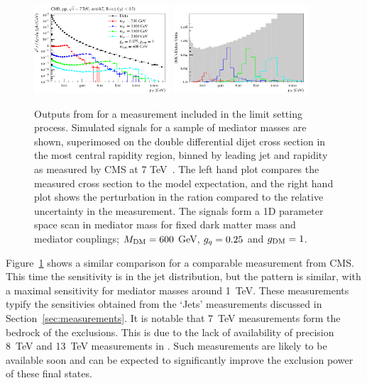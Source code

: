 \documentclass[floatfix]{article}
\begin{document}
\begin{figure}
\centering      
      \includegraphics[width=0.45\textwidth]{images/cmsjet/fullrange/CMSincljet.pdf}
      \includegraphics[width=0.45\textwidth]{images/cmsjet/ratio/CMSincljets_ratio.pdf}
\caption{Outputs from \rivet for a measurement included in the limit setting process. Simulated signals for a sample of mediator masses are shown, superimosed on 
the double differential dijet cross section in the most central rapidity region, binned by leading jet \pt and rapidity as measured by 
CMS at 7 TeV~\cite{Chatrchyan:2014gia}. The left hand plot compares the measured cross section to the model expectation, and the right hand plot shows the perturbation 
in the ration compared to the relative uncertainty in the measurement. The signals form a 1D parameter space scan in mediator mass for fixed dark matter mass 
and mediator couplings; $M_{\rm DM}=600$ GeV, $g_{q}=0.25$ and $g_{\rm DM} = 1$.}
\label{fig:CMSincljet}
\end{figure}

Figure~\ref{fig:CMSincljet} shows a similar comparison for a comparable measurement from CMS. This time the sensitivity is in the jet \pt distribution, but the pattern
is similar, with a maximal sensitivity for mediator masses around 1~TeV. These measurements typify the sensitivies obtained from the `Jets' measurements discussed in
Section~\ref{sec:measurements}. It is notable that 7~TeV measurements form the bedrock of the exclusions. This is due to the lack of availability of precision
8~TeV and 13~TeV measurements in \rivet. Such measurements are likely to be available soon and can be expected to significantly improve the exclusion power of these
final states.
\end{document}
